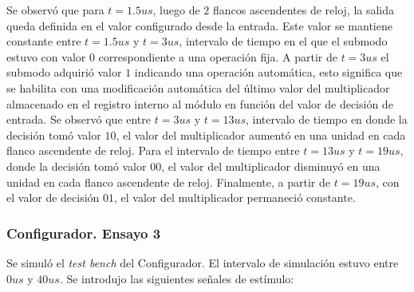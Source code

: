 Se observó que para $t = 1.5 us$, luego de $2$ flancos ascendentes de reloj, la salida queda definida en el valor configurado desde la entrada. Este valor se mantiene constante entre $t = 1.5 us$ y $t = 3 us$, intervalo de tiempo en el que el submodo estuvo con valor $0$ correspondiente a una operación fija. A partir de $t = 3 us$ el submodo adquirió valor $1$ indicando una operación automática, esto significa que se habilita con una modificación automática del último valor del multiplicador almacenado en el registro interno al módulo en función del valor de decisión de entrada. Se observó que entre $t = 3 us$ y $t = 13 us$, intervalo de tiempo en donde la decisión tomó valor $10$, el valor del multiplicador aumentó en una unidad en cada flanco ascendente de reloj. Para el intervalo de tiempo entre $t = 13 us$ y $t = 19 us$, donde la decisión tomó valor $00$, el valor del multiplicador disminuyó en una unidad en cada flanco ascendente de reloj. Finalmente, a partir de $t = 19 us$, con el valor de decisión $01$, el valor del multiplicador permaneció constante.



\subsubsection{Configurador. Ensayo 3}
\label{Subsec:Configurador. Ensayo 3}
Se simuló el \textit{test bench} del Configurador. El intervalo de simulación estuvo entre $0 us$ y $40 us$. Se introdujo las siguientes señales de estímulo:

